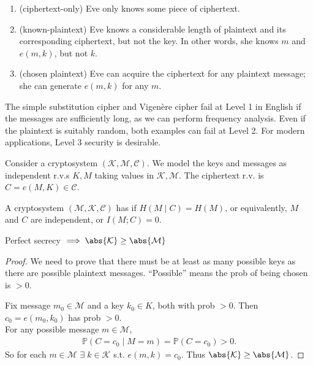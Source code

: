 \begin{enumerate}
    \item (ciphertext-only) Eve only knows some piece of ciphertext.
    \item (known-plaintext) Eve knows a considerable length of plaintext and its corresponding ciphertext, but not the key.
    In other words, she knows $m$ and $e(m,k)$, but not $k$.
    \item (chosen plaintext) Eve can acquire the ciphertext for any plaintext message; she can generate $e(m,k)$ for any $m$.
\end{enumerate}

\begin{remark}
    The simple substitution cipher and Vigen\`ere cipher fail at Level 1 in English if the messages are sufficiently long, as we can perform frequency analysis.
    Even if the plaintext is suitably random, both examples can fail at Level 2.
    For modern applications, Level 3 security is desirable.
\end{remark}

Consider a cryptosystem $(\mathcal K, \mathcal M, \mathcal C)$.
We model the keys and messages as independent r.v.s $K, M$ taking values in $\mathcal K, \mathcal M$.
The ciphertext r.v. is $C = e(M, K) \in \mathcal C$.

\begin{definition}
    A cryptosystem $(\mathcal M, \mathcal K, \mathcal C)$ has  if $H(M \mid C) = H(M)$, or equivalently, $M$ and $C$ are independent, or $I(M;C) = 0$.
\end{definition}

\begin{lemma}
    Perfect secrecy $\implies \abs{\mathcal K} \geq \abs{\mathcal M}$
\end{lemma}

\begin{proof}
    We need to prove that there must be at least as many possible keys as there are possible plaintext messages.
    ``Possible'' means the prob of being chosen is $> 0$.

    Fix message $m_0 \in \mathcal{M}$ and a key $k_0 \in K$, both with prob $> 0$.
    Then $c_0 = e(m_0, k_0)$ has prob $> 0$. \\
    For any possible message $m \in \mathcal{M}$,
    \begin{align*}
        \mathbb{P}(C = c_0 \mid M = m) = \mathbb{P}(C = c_0) > 0.
    \end{align*}
    So for each $m \in \mathcal{M}$ $\exists \; k \in \mathcal{K}$ s.t. $e(m, k) = c_0$.
    Thus $\abs{\mathcal{K}} \geq \abs{\mathcal{M}}$.
\end{proof}

